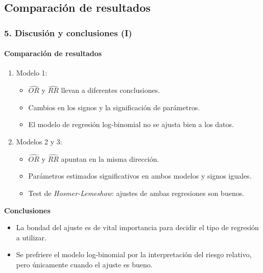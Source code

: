 \documentclass{beamer}
\begin{document}
\subsection{Comparación de resultados}
\begin{frame}
\frametitle{5. Discusión y conclusiones (I)}
\framesubtitle{Comparación de resultados}
\begin{enumerate}
		\item {\color{green!55!blue} Modelo 1:}
	\begin{itemize}\itemsep2pt
		\item $\widehat{OR}$ y $\widehat{RR}$ llevan a diferentes conclusiones. 
		\item Cambios en los signos y la significación de parámetros.
		\item El modelo de regresión log-binomial no se ajusta bien a los datos.
	\end{itemize}
	\vspace{0.3cm}
	\item  {\color{green!55!blue} Modelos 2 y 3:}
		\begin{itemize}\itemsep2pt
			\item $\widehat{OR}$ y $\widehat{RR}$ apuntan en la misma dirección.
			\item Parámetros estimados significativos en ambos modelos y signos iguales.
			\item Test de \textit{Hosmer-Lemeshow}:  ajustes de ambas regresiones son buenos.
	\end{itemize}
\end{enumerate}
	\begin{block}{\textbf{Conclusiones}}
			\begin{itemize}\itemsep2pt
			\item La bondad del ajuste es de vital importancia para decidir el tipo de regresión a utilizar.
			\item Se prefriere el modelo log-binomial por la interpretación del riesgo relativo, pero únicamente cuando el ajuste es bueno. 
		\end{itemize}
	\end{block}
\end{frame}

\end{document}

